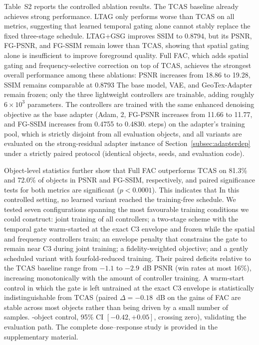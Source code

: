 \documentclass[times,twocolumn,final]{elsarticle}
\providecommand{\DIFadd}[1]{{\protect\color{red} \sf #1}} %
\providecommand{\DIFdel}[1]{{\protect\color{red} \scriptsize #1}} %
\providecommand{\DIFaddbegin}{} %
\providecommand{\DIFaddend}{} %
\providecommand{\DIFdelbegin}{} %
\providecommand{\DIFdelend}{} %
\newcommand{\DIFscaledelfig}{0.5}
\newlength{\DIFdelgraphicswidth} %
\newlength{\DIFdelgraphicsheight} %
\newcommand{\DIFaddincludegraphics}[2][]{{\color{red}\fbox{\DIFOincludegraphics[#1]{#2}}}} %
\newcommand{\DIFdelincludegraphics}[2][]{%
\sbox{\DIFdelgraphicsbox}{\DIFOincludegraphics[#1]{#2}}%
\settoboxwidth{\DIFdelgraphicswidth}{\DIFdelgraphicsbox} %
\settoboxtotalheight{\DIFdelgraphicsheight}{\DIFdelgraphicsbox} %
\scalebox{\DIFscaledelfig}{%
\parbox[b]{\DIFdelgraphicswidth}{\usebox{\DIFdelgraphicsbox}\\[-\baselineskip] \rule{\DIFdelgraphicswidth}{0em}}\llap{\resizebox{\DIFdelgraphicswidth}{\DIFdelgraphicsheight}{%
\setlength{\unitlength}{\DIFdelgraphicswidth}%
\begin{picture}(1,1)%
\thicklines\linethickness{2pt} %
{\color[rgb]{1,0,0}\put(0,0){\framebox(1,1){}}}%
{\color[rgb]{1,0,0}\put(0,0){\line( 1,1){1}}}%
{\color[rgb]{1,0,0}\put(0,1){\line(1,-1){1}}}%
\end{picture}%
}\hspace*{3pt}}} %
} %
\DeclareRobustCommand{\DIFaddbegin}{\DIFOaddbegin \let\includegraphics\DIFaddincludegraphics} %
\DeclareRobustCommand{\DIFaddend}{\DIFOaddend \let\includegraphics\DIFOincludegraphics} %
\DeclareRobustCommand{\DIFdelbegin}{\DIFOdelbegin \let\includegraphics\DIFdelincludegraphics} %
\DeclareRobustCommand{\DIFdelend}{\DIFOaddend \let\includegraphics\DIFOincludegraphics} %
\begin{document}
\DIFdel{Table~S2 reports the controlled ablation results. The TCAS baseline already achieves strong performance. LTAG only performs worse than TCAS on all metrics, suggesting that learned temporal gating alone cannot stably replace the fixed three-stage schedule. LTAG+GSG improves SSIM to 0.8794, but its PSNR, FG-PSNR, and FG-SSIM remain lower than TCAS, showing that spatial gating alone is insufficient to improve foreground quality. Full FAC, which adds spatial gating and frequency-selective correction on top of TCAS, achieves the strongest overall performance among these ablations: PSNR increases from 18.86 to 19.28, SSIM remains comparable at 0.8793}\DIFdelend \DIFaddbegin \DIFadd{The base model, VAE, and GeoTex-Adapter remain frozen; only the three lightweight controllers are trainable, adding roughly $6\times10^{3}$ parameters. The controllers are trained with the same enhanced denoising objective as the base adapter (Adam, 2}{\DIFaddend ,\DIFdelbegin \DIFdel{FG-PSNR increases from 11.66 to 11.77, and FG-SSIM increases from 0.4755 to 0.4830. }\DIFdelend \DIFaddbegin }\DIFadd{000 steps) on the adapter's training pool, which is strictly disjoint from all evaluation objects, and all variants are evaluated on the strong-residual adapter instance of Section~\ref{subsec:adapterdep} under a strictly paired protocol (identical objects, seeds, and evaluation code).
}\DIFaddend 

\DIFdelbegin \DIFdel{Object-level statistics further show that Full FAC outperforms TCAS on 81.3\% and 72.0\% of objects in PSNR and FG-SSIM, respectively, and paired significance tests for both metrics are significant ($p < 0.0001$). This indicates that }\DIFdelend \DIFaddbegin \DIFadd{In this controlled setting, no learned variant reached the training-free schedule. We tested seven configurations spanning the most favourable training conditions we could construct: joint training of all controllers; a two-stage scheme with the temporal gate warm-started at the exact C3 envelope and frozen while the spatial and frequency controllers train; an envelope penalty that constrains the gate to remain near C3 during joint training; a fidelity-weighted objective; and a gently scheduled variant with fourfold-reduced training. Their paired deficits relative to the TCAS baseline range from $-1.1$ to $-2.9$~dB PSNR (win rates at most 16\%), increasing monotonically with the amount of controller training. A warm-start control in which the gate is left untrained at the exact C3 envelope is statistically indistinguishable from TCAS (paired $\Delta=-0.18$~dB on }\DIFaddend the \DIFdelbegin \DIFdel{gains of FAC are stable across most objects rather than being driven by a small number of samples. }\DIFdelend \DIFaddbegin \DIFadd{12-object control, 95\% CI $[-0.42,+0.05]$, crossing zero), validating the evaluation path. The complete dose--response study is provided in the supplementary material.
}\DIFaddend 
\end{document}
